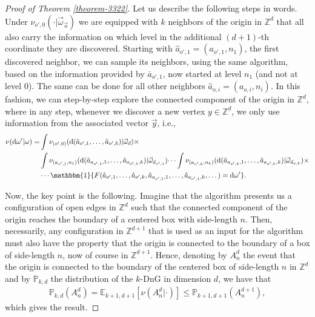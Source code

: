 \documentclass[a4paper, oneside, 11pt]{amsart}
\theoremstyle{definition}
\renewcommand{\P}{\mathbb{P}}
\newcommand{\1}{\mathbbm{1}}
\newcommand{\E}{\mathbb{E}}
\newcommand{\0}{\mathbf{o}}
\renewcommand{\d}{\mathrm{d}}
\newcommand{\Z}{\mathbb{Z}}
\numberwithin{equation}{section}
\begin{document}
\begin{proof}[Proof of Theorem \ref{theorem-3322}]
Let us describe the following steps in words. Under $\nu_{o',0}(\cdot|\vec\omega_{\vec o})$ we are equipped with $k$ neighbors of the origin in $\Z^d$ that all also carry the information on which level in the additional $(d+1)$-th coordinate they are discovered. Starting with $\hat a_{o',1}=(a_{o',1},n_1)$, the first discovered neighbor, we can sample its neighbors, using the same algorithm, based on the information provided by $\bar a_{o',1}$, now started at level $n_1$ (and not at level $0$). The same can be done for all other neighbors $\hat a_{o,i}=(a_{o,i},n_i)$. In this fashion, we can step-by-step explore the connected component of the origin in $\Z^d$, where in any step, whenever we discover a new vertex $y\in \Z^d$, we only use information from the associated vector $\vec y$, i.e., 
\begin{align*}
\nu(\d \omega'|\omega)=&\int \nu_{(o',0)}(\d(\hat a_{o',1},\dots,\hat a_{o',k})|\vec \omega_{\vec o})\times\\
&\int\nu_{(a_{o',1},n_1)}(\d(\hat a_{a_{o',1},1},\dots,\hat a_{a_{o',1},k})|\vec \omega_{\vec a_{o',1}})\dots \int\nu_{(a_{o',k},n_k)}(\d(\hat a_{a_{o',k},1},\dots,\hat a_{a_{o',k},k})|\vec \omega_{\vec a_{o,k}})\times\\
&\cdots \1\{F(\hat a_{o',1},\dots,\hat a_{o',k},\hat a_{a_{o',1},1},\dots,\hat a_{a_{o',1},k},\dots)=\d \omega'\}.
\end{align*}

Now, the key point is the following. Imagine that the algorithm presents us a configuration of open edges in $\Z^d$ such that the connected component of the origin reaches the boundary of a centered box with side-length $n$. Then, necessarily, any configuration in $\Z^{d+1}$ that is used as an input for the algorithm must also have the property that the origin is connected to the boundary of a box of side-length $n$, now of course in  $\Z^{d+1}$. Hence, denoting by $A^{d}_n$ the event that the origin is connected to the boundary of the centered box of side-length $n$ in $\Z^d$ and by $\P_{k,d}$ the distribution of the $k$-DnG in dimension $d$, we have that 
\begin{align*}
\P_{k,d}(A^d_n)=\E_{k+1,d+1}[\nu(A^d_n|\cdot)]\le \P_{k+1,d+1}(A^{d+1}_n), 
\end{align*}
which gives the result.
\end{proof}
\end{document}
